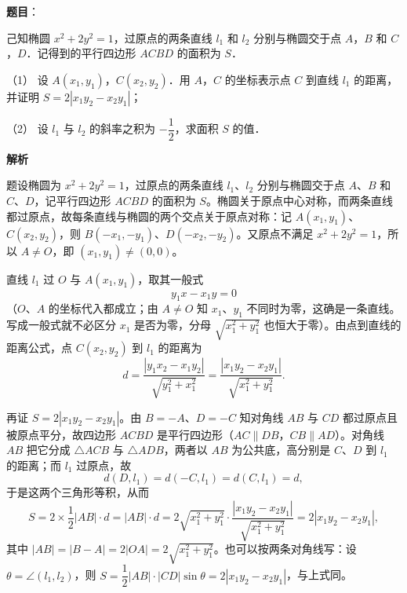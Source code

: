 \begin{answer}

\textbf{题目}：

己知椭圆 \(x^{2}+2y^{2}=1\)，过原点的两条直线 \(l_{1}\) 和 \(l_{2}\) 分别与椭圆交于点 \(A\)，\(B\) 和 \(C\)，\(D\)．记得到的平行四边形 \(ACBD\) 的面积为 \(S\)．

（1） 设 \(A(x_{1},y_{1})\)，\(C(x_{2},y_{2})\)．用 \(A\)，\(C\) 的坐标表示点 \(C\) 到直线 \(l_{1}\) 的距离，并证明 \(S=2|x_{1}y_{2}-x_{2}y_{1}|\)；

（2） 设 \(l_{1}\) 与 \(l_{2}\) 的斜率之积为 \(-\dfrac{1}{2}\)，求面积 \(S\) 的值．

\textbf{解析}

题设椭圆为 \(x^{2}+2y^{2}=1\)，过原点的两条直线 \(l_{1}\)、\(l_{2}\) 分别与椭圆交于点 \(A\)、\(B\) 和 \(C\)、\(D\)，记平行四边形 \(ACBD\) 的面积为 \(S\)。椭圆关于原点中心对称，而两条直线都过原点，故每条直线与椭圆的两个交点关于原点对称：记 \(A(x_{1},y_{1})\)、\(C(x_{2},y_{2})\)，则 \(B(-x_{1},-y_{1})\)、\(D(-x_{2},-y_{2})\)。又原点不满足 \(x^{2}+2y^{2}=1\)，所以 \(A\neq O\)，即 \((x_{1},y_{1})\neq(0,0)\)。


直线 \(l_{1}\) 过 \(O\) 与 \(A(x_{1},y_{1})\)，取其一般式
\nopagebreak[4]
\[
y_{1}x-x_{1}y=0
\]
（\(O\)、\(A\) 的坐标代入都成立；由 \(A\neq O\) 知 \(x_{1}\)、\(y_{1}\) 不同时为零，这确是一条直线。写成一般式就不必区分 \(x_{1}\) 是否为零，分母 \(\sqrt{x_{1}^{2}+y_{1}^{2}}\) 也恒大于零）。由点到直线的距离公式，点 \(C(x_{2},y_{2})\) 到 \(l_{1}\) 的距离为
\nopagebreak[4]
\[
d=\frac{|y_{1}x_{2}-x_{1}y_{2}|}{\sqrt{y_{1}^{2}+x_{1}^{2}}}=\frac{|x_{1}y_{2}-x_{2}y_{1}|}{\sqrt{x_{1}^{2}+y_{1}^{2}}}.
\]

再证 \(S=2|x_{1}y_{2}-x_{2}y_{1}|\)。由 \(B=-A\)、\(D=-C\) 知对角线 \(AB\) 与 \(CD\) 都过原点且被原点平分，故四边形 \(ACBD\) 是平行四边形（\(AC\parallel DB\)，\(CB\parallel AD\)）。对角线 \(AB\) 把它分成 \(\triangle ACB\) 与 \(\triangle ADB\)，两者以 \(AB\) 为公共底，高分别是 \(C\)、\(D\) 到 \(l_{1}\) 的距离；而 \(l_{1}\) 过原点，故
\nopagebreak[4]
\[
d(D,l_{1})=d(-C,l_{1})=d(C,l_{1})=d,
\]
于是这两个三角形等积，从而
\nopagebreak[4]
\[
S=2\times\frac{1}{2}|AB|\cdot d=|AB|\cdot d=2\sqrt{x_{1}^{2}+y_{1}^{2}}\cdot\frac{|x_{1}y_{2}-x_{2}y_{1}|}{\sqrt{x_{1}^{2}+y_{1}^{2}}}=2|x_{1}y_{2}-x_{2}y_{1}|,
\]
其中 \(|AB|=|B-A|=2|OA|=2\sqrt{x_{1}^{2}+y_{1}^{2}}\)。也可以按两条对角线写：设 \(\theta=\angle(l_{1},l_{2})\)，则 \(S=\dfrac{1}{2}|AB|\cdot|CD|\sin\theta=2|x_{1}y_{2}-x_{2}y_{1}|\)，与上式同。


\end{answer}
